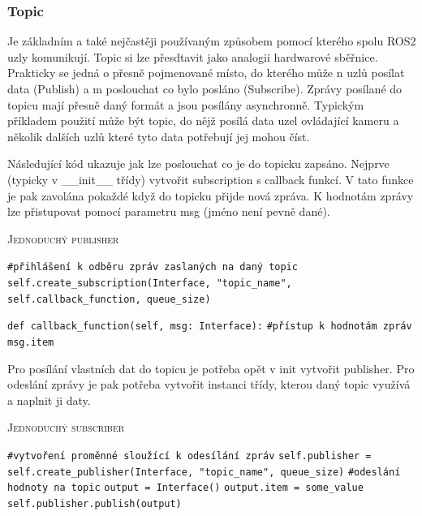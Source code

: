 
\subsubsection*{Topic}
Je základním a také nejčastěji používaným způsobem pomocí kterého spolu ROS2 uzly komunikují. Topic si lze přesdtavit jako analogii hardwarové sběřnice. Prakticky se jedná o přesně pojmenované místo, do kterého může n uzlů posílat data (Publish) a m poslouchat co bylo posláno (Subscribe). Zprávy posílané do topicu mají přesně daný formát a jsou posílány asynchronně. Typickým příkladem použití může být topic, do nějž posílá data uzel ovládající kameru a několik dalších uzlů které tyto data potřebují jej mohou číst. \cite{ros2_introduction}

Následující kód ukazuje jak lze poslouchat co je do topicku zapsáno. Nejprve (typicky v \_\_init\_\_ třídy) vytvořit subscription s callback funkcí. V tato funkce je pak zavolána pokaždé když do topicku přijde nová zpráva. K hodnotám zprávy lze přistupovat pomocí parametru msg (jméno není pevně dané).

\begin{algorithm}[h!]
	\label{}
	\caption{\textsc{Jednoduchý publisher}}
	
	\DontPrintSemicolon
	\SetAlgoNoLine
	\SetNlSty{}{}{:}
	\SetNlSkip{-1.1em}
	
	\BlankLine \Indp\Indpp
	
	\texttt{\#přihlášení k odběru zpráv zaslaných na daný topic}\;
	\texttt{self.create\_subscription(Interface, "topic\_name", self.callback\_function, queue\_size)}\;
	
	\BlankLine
	\texttt{def callback\_function(self, msg: Interface):}\; %
	\Indp\Indp
	\texttt{\#přístup k hodnotám zpráv}\;
	\texttt{msg.item}\;
\end{algorithm}

Pro posílání vlastních dat do topicu je potřeba opět v init vytvořit publisher. Pro odeslání zprávy je pak potřeba vytvořit instanci třídy, kterou daný topic využívá a naplnit ji daty.

\begin{algorithm}[h!]
	\label{}
	\caption{\textsc{Jednoduchý subscriber}}
	
	\DontPrintSemicolon
	\SetAlgoNoLine
	\SetAlgoNlRelativeSize{-1}
	\SetNlSty{}{}{:}
	\SetNlSkip{-1.1em}
	
	\BlankLine \Indp\Indpp
	
	\texttt{\#vytvoření proměnné sloužící k odesílání zpráv}\;
	\texttt{self.publisher = self.create\_publisher(Interface, "topic\_name", queue\_size)}\;
	\BlankLine
	\texttt{\#odeslání hodnoty na topic}\;   
	\texttt{output = Interface()}\;
	\texttt{output.item = some\_value}\;
	\texttt{self.publisher.publish(output)}\;
\end{algorithm}


